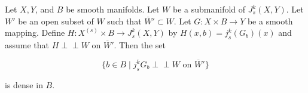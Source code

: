 Let $X, Y$, and $B$ be smooth manifolds. Let $W$ be a submanifold of $J_s^k(X, Y)$. Let $W'$ be an open subset of $W$ such that $\overline{W}' \subset W$. Let $G: X \times B \rightarrow Y$ be a smooth mapping. Define $H: X^{(s)} \times B \rightarrow J_s^k(X, Y)$ by $H(x, b) = j_s^k(G_b)(x)$ and assume that $H \mathrel{\perp\!\!\!\perp} W$ on $\overline{W}'$. Then the set

$$\{b \in B \mid j_s^k G_b \mathrel{\perp\!\!\!\perp} W \text{ on } \overline{W}'\}$$

is dense in $B$.
